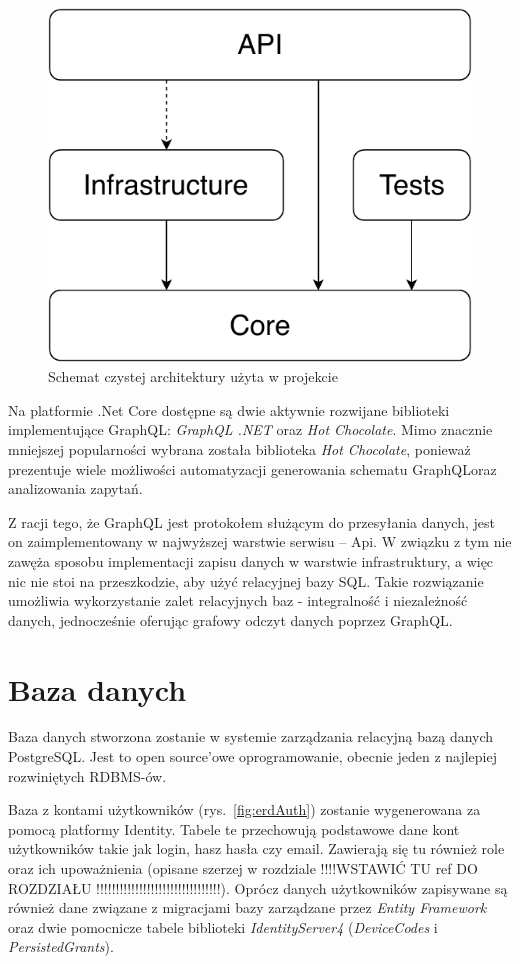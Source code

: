 	\begin{figure}[ht]
		\centering
			\includegraphics[width=0.3\linewidth]{rys03/CleanArch.pdf}
		 \caption{Schemat czystej architektury użyta w projekcie}
		 \label{fig:cleanArch}
	\end{figure}

	Na platformie \@.Net Core dostępne są dwie aktywnie rozwijane biblioteki implementujące GraphQL\@: \emph{GraphQL \@.NET} oraz \emph{Hot Chocolate}.
	Mimo znacznie mniejszej popularności wybrana została biblioteka \emph{Hot Chocolate},
	ponieważ prezentuje wiele możliwości automatyzacji generowania schematu GraphQL\@ oraz analizowania zapytań.

	Z racji tego, że GraphQL jest protokołem służącym do przesyłania danych, jest on zaimplementowany w najwyższej warstwie serwisu -- Api.
	W związku z tym nie zawęża sposobu implementacji zapisu danych w warstwie infrastruktury,
	a więc nic nie stoi na przeszkodzie, aby użyć relacyjnej bazy SQL.
	Takie rozwiązanie umożliwia wykorzystanie zalet relacyjnych baz - integralność i niezależność danych,
	jednocześnie oferując grafowy odczyt danych poprzez GraphQL.

\section{Baza danych}
	Baza danych stworzona zostanie w systemie zarządzania relacyjną bazą danych PostgreSQL.
	Jest to open source'owe oprogramowanie, obecnie jeden z najlepiej rozwiniętych RDBMS-ów.

	Baza z kontami użytkowników (rys.~\ref{fig:erdAuth}) zostanie wygenerowana za pomocą platformy Identity.
	Tabele te przechowują podstawowe dane kont użytkowników takie jak login, hasz hasła czy email.
	Zawierają się tu również role oraz ich upoważnienia (opisane szerzej w rozdziale !!!!WSTAWIĆ TU ref DO ROZDZIAŁU !!!!!!!!!!!!!!!!!!!!!!!!!!!!!!!!).
	Oprócz danych użytkowników zapisywane są również dane związane z migracjami bazy zarządzane przez \emph{Entity Framework}
	oraz dwie pomocnicze tabele biblioteki \emph{IdentityServer4} (\emph{DeviceCodes} i \emph{PersistedGrants}).

